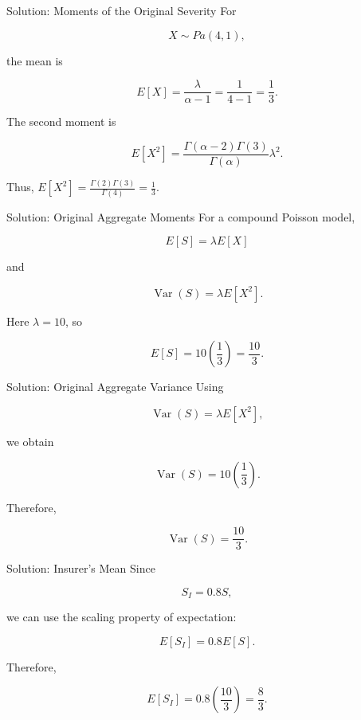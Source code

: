 \documentclass[
  ignorenonframetext,
  aspectratio=169,
]{beamer}
\begin{document}
\begin{frame}{Solution: Moments of the Original Severity}
\protect{}\label{solution-moments-of-the-original-severity}
For

\[
X\sim Pa(4,1),
\]

the mean is

\[
E[X]=\frac{\lambda}{\alpha-1}
=\frac{1}{4-1}
=\frac{1}{3}.
\]

The second moment is

\[
E[X^2]
=
\frac{\Gamma(\alpha-2)\Gamma(3)}
{\Gamma(\alpha)}
\lambda^2.
\]

Thus, \(E[X^2]=\frac{\Gamma(2)\Gamma(3)}{\Gamma(4)}=\frac{1}{3}.\)
\end{frame}

\begin{frame}{Solution: Original Aggregate Moments}
\protect{}\label{solution-original-aggregate-moments}
For a compound Poisson model,

\[
E[S]=\lambda E[X]
\]

and

\[
\operatorname{Var}(S)=\lambda E[X^2].
\]

Here \(\lambda=10\), so

\[
E[S]
=
10\left(\frac{1}{3}\right)
=
\boxed{\frac{10}{3}}.
\]
\end{frame}

\begin{frame}{Solution: Original Aggregate Variance}
\protect{}\label{solution-original-aggregate-variance}
Using

\[
\operatorname{Var}(S)=\lambda E[X^2],
\]

we obtain

\[
\operatorname{Var}(S)
=
10\left(\frac{1}{3}\right).
\]

Therefore,

\[
\boxed{\operatorname{Var}(S)=\frac{10}{3}}.
\]
\end{frame}

\begin{frame}{Solution: Insurer's Mean}
\protect{}\label{solution-insurers-mean}
Since

\[
S_I=0.8S,
\]

we can use the scaling property of expectation:

\[
E[S_I]
=
0.8E[S].
\]

Therefore,

\[
E[S_I]
=
0.8\left(\frac{10}{3}\right)
=
\boxed{\frac{8}{3}}.
\]
\end{frame}
\end{document}
